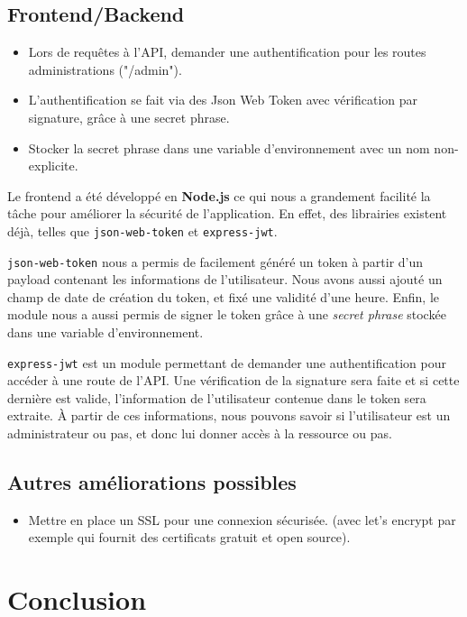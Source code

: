 \documentclass[a4paper]{article}
\begin{document}
\subsection{Frontend/Backend}
\begin{itemize}
\item Lors de requêtes à l'API, demander une authentification pour les routes administrations ("/admin").
\item L'authentification se fait via des Json Web Token avec vérification par signature, grâce à une secret phrase.
\item Stocker la secret phrase dans une variable d'environnement avec un nom non-explicite.
\end{itemize}

Le frontend a été développé en \textbf{Node.js} ce qui nous a grandement facilité la tâche pour améliorer la sécurité de l'application. En effet, des librairies existent déjà, telles que \texttt{json-web-token} et \texttt{express-jwt}.

\texttt{json-web-token} nous a permis de facilement généré un token à partir d'un payload contenant les informations de l'utilisateur. Nous avons aussi ajouté un champ de date de création du token, et fixé une validité d'une heure. Enfin, le module nous a aussi permis de signer le token grâce à une \textit{secret phrase} stockée dans une variable d'environnement.

\texttt{express-jwt} est un module permettant de demander une authentification pour accéder à une route de l'API. Une vérification de la signature sera faite et si cette dernière est valide, l'information de l'utilisateur contenue dans le token sera extraite. À partir de ces informations, nous pouvons savoir si l'utilisateur est un administrateur ou pas, et donc lui donner accès à la ressource ou pas.

\subsection{Autres améliorations possibles}
\begin{itemize}
\item Mettre en place un SSL pour une connexion sécurisée. (avec let's encrypt par exemple qui fournit des certificats gratuit et open source).
\end{itemize}
\section{Conclusion}
\end{document}
